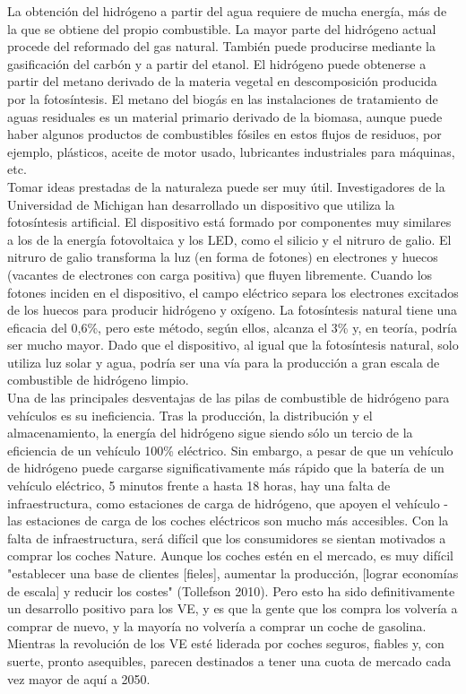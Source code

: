 \documentclass[runningheads]{llncs}
\begin{document}
La obtención del hidrógeno a partir del agua requiere de mucha energía, más de la que se obtiene del propio combustible. La mayor parte del hidrógeno actual procede del reformado del gas natural. También puede producirse mediante la gasificación del carbón y a partir del etanol. El hidrógeno puede obtenerse a partir del metano derivado de la materia vegetal en descomposición producida por la fotosíntesis. El metano del biogás en las instalaciones de tratamiento de aguas residuales es un material primario derivado de la biomasa, aunque puede haber algunos productos de combustibles fósiles en estos flujos de residuos, por ejemplo, plásticos, aceite de motor usado, lubricantes industriales para máquinas, etc. \\

Tomar ideas prestadas de la naturaleza puede ser muy útil. Investigadores de la Universidad de Michigan han desarrollado un dispositivo que utiliza la fotosíntesis artificial. El dispositivo está formado por componentes muy similares a los de la energía fotovoltaica y los LED, como el silicio y el nitruro de galio. El nitruro de galio transforma la luz (en forma de fotones) en electrones y huecos (vacantes de electrones con carga positiva) que fluyen libremente. Cuando los fotones inciden en el dispositivo, el campo eléctrico separa los electrones excitados de los huecos para producir hidrógeno y oxígeno. La fotosíntesis natural tiene una eficacia del 0,6\%, pero este método, según ellos, alcanza el 3\% y, en teoría, podría ser mucho mayor. Dado que el dispositivo, al igual que la fotosíntesis natural, solo utiliza luz solar y agua, podría ser una vía para la producción a gran escala de combustible de hidrógeno limpio. \\

Una de las principales desventajas de las pilas de combustible de hidrógeno para vehículos es su ineficiencia. Tras la producción, la distribución y el almacenamiento, la energía del hidrógeno sigue siendo sólo un tercio de la eficiencia de un vehículo 100\% eléctrico. Sin embargo, a pesar de que un vehículo de hidrógeno puede cargarse significativamente más rápido que la batería de un vehículo eléctrico, 5 minutos frente a hasta 18 horas, hay una falta de infraestructura, como estaciones de carga de hidrógeno, que apoyen el vehículo - las estaciones de carga de los coches eléctricos son mucho más accesibles. Con la falta de infraestructura, será difícil que los consumidores se sientan motivados a comprar los coches Nature. Aunque los coches estén en el mercado, es muy difícil "establecer una base de clientes [fieles], aumentar la producción, [lograr economías de escala] y reducir los costes" (Tollefson 2010). Pero esto ha sido definitivamente un desarrollo positivo para los VE, y es que la gente que los compra los volvería a comprar de nuevo, y la mayoría no volvería a comprar un coche de gasolina. Mientras la revolución de los VE esté liderada por coches seguros, fiables y, con suerte, pronto asequibles, parecen destinados a tener una cuota de mercado cada vez mayor de aquí a 2050. \\
\end{document}
